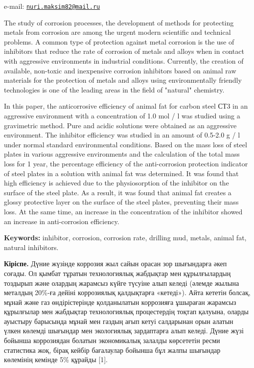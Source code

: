e-mail:
\href{mailto:nuri.maksim82@mail.ru}{\nolinkurl{nuri.maksim82@mail.ru}}

The study of corrosion processes, the development of methods for
protecting metals from corrosion are among the urgent modern scientific
and technical problems. A common type of protection against metal
corrosion is the use of inhibitors that reduce the rate of corrosion of
metals and alloys when in contact with aggressive environments in
industrial conditions. Currently, the creation of available, non-toxic
and inexpensive corrosion inhibitors based on animal raw materials for
the protection of metals and alloys using environmentally friendly
technologies is one of the leading areas in the field of "natural"
chemistry.

In this paper, the anticorrosive efficiency of animal fat for carbon
steel СТ3 in an aggressive environment with a concentration of 1.0 mol /
l was studied using a gravimetric method. Pure and acidic solutions were
obtained as an aggressive environment. The inhibitor efficiency was
studied in an amount of 0.5-2.0 g / l under normal standard
environmental conditions. Based on the mass loss of steel plates in
various aggressive environments and the calculation of the total mass
loss for 1 year, the percentage efficiency of the anti-corrosion
protection indicator of steel plates in a solution with animal fat was
determined. It was found that high efficiency is achieved due to the
physiosorption of the inhibitor on the surface of the steel plate. As a
result, it was found that animal fat creates a glossy protective layer
on the surface of the steel plates, preventing their mass loss. At the
same time, an increase in the concentration of the inhibitor showed an
increase in anti-corrosion efficiency.

{\bfseries Keywords:} inhibitor, corrosion, corrosion rate, drilling mud,
metals, animal fat, natural inhibitors.

{\bfseries Кіріспе.} Дүние жүзінде коррозия жыл сайын орасан зор шығындарға
әкеп соғады. Ол қымбат тұратын технологиялық жабдықтар мен құрылғылардың
тоздырып және олардың жарамсыз күйге түсуіне алып келеді (әлемде жылына
металдың 20\%-ға дейіні коррозиялық қалдықтарға «кетеді»). Айта кететін
болсақ, мұнай және газ өндірістерінде қолданылатын коррозияға ұшыраған
жарамсыз құрылғылар мен жабдықтар технологиялық процестердің тоқтап
қалуына, оларды ауыстыру барысында мұнай мен газдың ағып кетуі
салдарынан орын алатын үлкен көлемді шығындар мен экологиялық
зардаптарға алып келеді. Дүние жүзі бойынша коррозиядан болатын
экономикалық залалды көрсететін ресми статистика жоқ, бірақ кейбір
бағалаулар бойынша бұл жалпы шығындар көлемінің кемінде 5\% құрайды
{[}1{]}.

